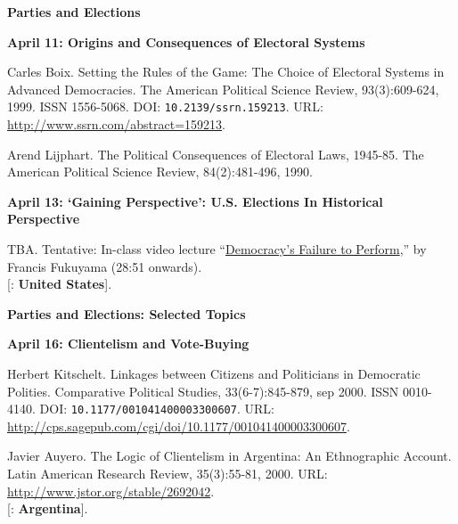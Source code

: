 \documentclass[letterpaper]{article}
\renewenvironment{itemize}{
  \begin{list}{}{
    \setlength{\leftmargin}{1.5em}
  }
}{
  \end{list}
}
\begin{document}
\begin{enumerate}
\item {\bf Parties and Elections}
	\begin{itemize} 
		\item {\bf April 11: Origins and Consequences of Electoral Systems}
			\begin{itemize} 
				\item[$\bullet$] Carles Boix. Setting the Rules of the Game: The Choice of Electoral Systems in Advanced Democracies. The American Political Science Review, 93(3):609-624, 1999. ISSN 1556-5068. DOI: \texttt{10.2139/ssrn.159213}. URL: \url{http://www.ssrn.com/abstract=159213}.
				\item[$\bullet$] Arend Lijphart. The Political Consequences of Electoral Laws, 1945-85. The American Political Science Review, 84(2):481-496, 1990.
			\end{itemize}
		\item {\bf April 13: `Gaining Perspective': U.S. Elections In Historical Perspective}
			\begin{itemize}
				\item[$\bullet$] TBA. Tentative: In-class video lecture ``\href{https://www.youtube.com/watch?v=gF8CJSQf238}{Democracy's Failure to Perform},'' by Francis Fukuyama (28:51 onwards).\\
			{\color{brown}[\faGlobe: {\bf United States}].}
			\end{itemize}
	\end{itemize}


\item {\bf Parties and Elections: Selected Topics}
	\begin{itemize} 
		\item {\bf April 16: Clientelism and Vote-Buying}
		\begin{itemize}
			\item[$\bullet$] Herbert Kitschelt. Linkages between Citizens and Politicians in Democratic Polities. Comparative Political Studies, 33(6-7):845-879, sep 2000. ISSN 0010-4140. DOI: \texttt{10.1177/001041400003300607}. URL: \url{http://cps.sagepub.com/cgi/doi/10.1177/001041400003300607}.
			\item[$\bullet$] Javier Auyero. The Logic of Clientelism in Argentina: An Ethnographic Account. Latin American Research Review, 35(3):55-81, 2000. URL: \url{http://www.jstor.org/stable/2692042}.\\
			{\color{brown}[\faGlobe: {\bf Argentina}].}


\end{itemize}
\end{itemize}
\end{enumerate}
\end{document}

